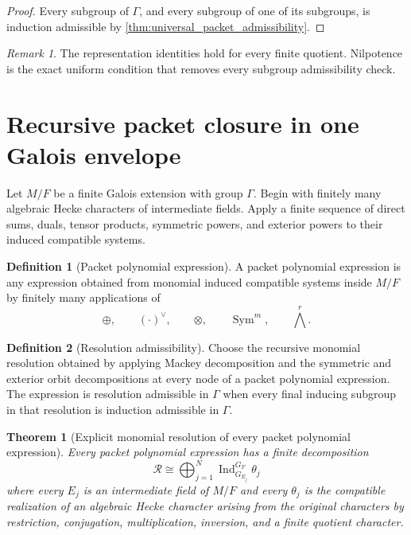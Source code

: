 \documentclass{aomart}
\newtheorem{theorem}{Theorem}[section]
\theoremstyle{definition}
\newtheorem{definition}[definition]{Definition}
\theoremstyle{remark}
\newtheorem{remark}[remark]{Remark}
\newcommand{\Ind}{\operatorname{Ind}}
\newcommand{\Sym}{\operatorname{Sym}}
\newcommand{\calR}{\mathcal R}
\begin{document}
\begin{proof}
Every subgroup of \(\Gamma\), and every subgroup of one of its subgroups, is induction admissible by \cref{thm:universal_packet_admissibility}.
\end{proof}

\begin{remark}\label{rem:nilpotent_reason}
The representation identities hold for every finite quotient. Nilpotence is the exact uniform condition that removes every subgroup admissibility check.
\end{remark}


\section{Recursive packet closure in one Galois envelope}\label{sec:polynomial_closure}

Let \(M/F\) be a finite Galois extension with group \(\Gamma\). Begin with finitely many algebraic Hecke characters of intermediate fields. Apply a finite sequence of direct sums, duals, tensor products, symmetric powers, and exterior powers to their induced compatible systems.

\begin{definition}[Packet polynomial expression]\label{def:packet_polynomial}
A packet polynomial expression is any expression obtained from monomial induced compatible systems inside \(M/F\) by finitely many applications of
\[
\oplus,
\qquad
(\cdot)^\vee,
\qquad
\otimes,
\qquad
\Sym^m,
\qquad
\bigwedge^r.
\]
\end{definition}

\begin{definition}[Resolution admissibility]\label{def:resolution_admissibility}
Choose the recursive monomial resolution obtained by applying Mackey decomposition and the symmetric and exterior orbit decompositions at every node of a packet polynomial expression. The expression is resolution admissible in \(\Gamma\) when every final inducing subgroup in that resolution is induction admissible in \(\Gamma\).
\end{definition}

\begin{theorem}[Explicit monomial resolution of every packet polynomial expression]\label{thm:packet_polynomial_resolution}
Every packet polynomial expression has a finite decomposition
\[
\boxed{
\calR
\cong
\bigoplus_{j=1}^{N}
\Ind_{G_{E_j}}^{G_F}\theta_j
}
\]
where every \(E_j\) is an intermediate field of \(M/F\) and every \(\theta_j\) is the compatible realization of an algebraic Hecke character arising from the original characters by restriction, conjugation, multiplication, inversion, and a finite quotient character.
\end{theorem}
\end{document}
